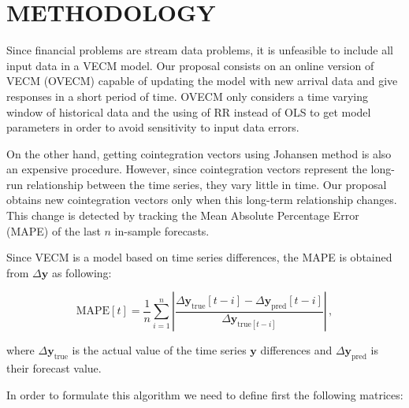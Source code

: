 \section{\uppercase{Methodology}}
\label{sec:methodology}
\noindent 

Since financial problems are stream data problems, it is unfeasible to include
all input data in a VECM model. Our proposal consists on an online version of
VECM (OVECM) capable of updating the model with new arrival data and give
responses in a short period of time. OVECM only considers a time varying window
of historical data and the using of RR instead of OLS to get model parameters in
order to avoid sensitivity to input data errors.

On the other hand, getting cointegration vectors using Johansen method is also
an expensive procedure. However, since cointegration
vectors represent the long-run relationship between the time series, they
vary little in time. Our proposal obtains new cointegration vectors only when
this long-term relationship changes. This change is detected by tracking 
the Mean Absolute Percentage Error (MAPE) of the last $n$ in-sample forecasts.

Since VECM is a model based on time series differences, the MAPE is obtained
from $\Delta \mathbf{y}$ as following:
 
\begin{equation}\label{eq:MAPE}
\text{MAPE}[t] = \frac{1}{n} \sum_{i=1}^{n} \left| 
\frac{\Delta \mathbf{y}_{\text{true}}[t-i]-\Delta
\mathbf{y}_{\text{pred}}[t-i]}{\Delta \mathbf{y}_{\text{true}[t-i]}}
\right| \, , 
\end{equation}

\noindent where $\Delta \mathbf{y}_{\text{true}}$ is the actual value of the
time series $\mathbf{y}$ differences and $\Delta \mathbf{y}_{\text{pred}}$ is
their forecast value.





In order to formulate this algorithm we need to define first the
following matrices:
 

